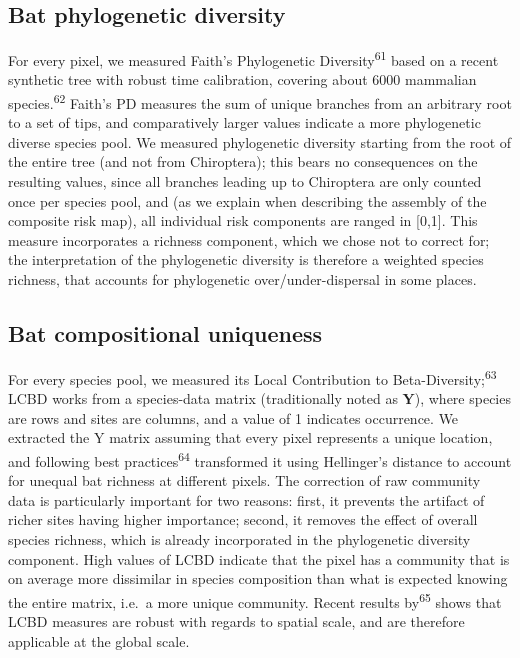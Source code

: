\documentclass[10pt,oneside]{article}
\begin{document}
\hypertarget{bat-phylogenetic-diversity}{%
\subsection{Bat phylogenetic
diversity}\label{bat-phylogenetic-diversity}}

For every pixel, we measured Faith's Phylogenetic
Diversity\textsuperscript{61} based on a recent synthetic tree with
robust time calibration, covering about 6000 mammalian
species.\textsuperscript{62} Faith's PD measures the sum of unique
branches from an arbitrary root to a set of tips, and comparatively
larger values indicate a more phylogenetic diverse species pool. We
measured phylogenetic diversity starting from the root of the entire
tree (and not from Chiroptera); this bears no consequences on the
resulting values, since all branches leading up to Chiroptera are only
counted once per species pool, and (as we explain when describing the
assembly of the composite risk map), all individual risk components are
ranged in {[}0,1{]}. This measure incorporates a richness component,
which we chose not to correct for; the interpretation of the
phylogenetic diversity is therefore a weighted species richness, that
accounts for phylogenetic over/under-dispersal in some places.

\hypertarget{bat-compositional-uniqueness}{%
\subsection{Bat compositional
uniqueness}\label{bat-compositional-uniqueness}}

For every species pool, we measured its Local Contribution to
Beta-Diversity;\textsuperscript{63} LCBD works from a species-data
matrix (traditionally noted as \(\mathbf{Y}\)), where species are rows
and sites are columns, and a value of 1 indicates occurrence. We
extracted the Y matrix assuming that every pixel represents a unique
location, and following best practices\textsuperscript{64} transformed
it using Hellinger's distance to account for unequal bat richness at
different pixels. The correction of raw community data is particularly
important for two reasons: first, it prevents the artifact of richer
sites having higher importance; second, it removes the effect of overall
species richness, which is already incorporated in the phylogenetic
diversity component. High values of LCBD indicate that the pixel has a
community that is on average more dissimilar in species composition than
what is expected knowing the entire matrix, i.e.~a more unique
community. Recent results by\textsuperscript{65} shows that LCBD
measures are robust with regards to spatial scale, and are therefore
applicable at the global scale.
\end{document}
